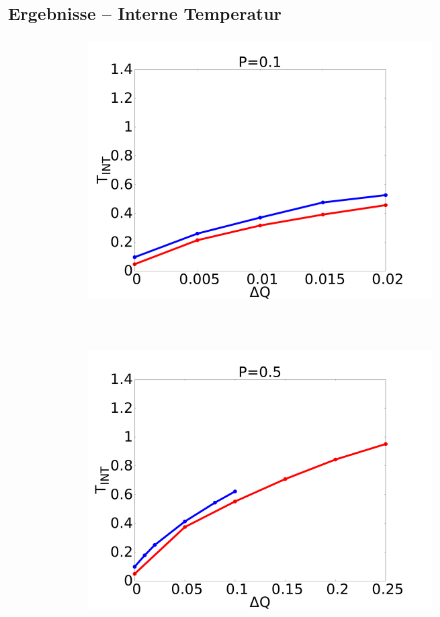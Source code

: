 \documentclass[handout]{beamer}
\begin{document}
\begin{frame}
\frametitle{Ergebnisse -- Interne Temperatur}
\begin{figure}
    \begin{center}
        \begin{subfigure}[t]{0.3\textwidth}
            \includegraphics[scale=0.11]{../images/p01_int.pdf}
        \end{subfigure} 
        \
        \begin{subfigure}[t]{0.3\textwidth}
            \includegraphics[scale=0.11]{../images/p05_int.pdf}
        \end{subfigure} 
        \
        \begin{subfigure}[t]{0.3\textwidth}

\end{subfigure}
\end{center}
\end{figure}
\end{frame}
\end{document}
